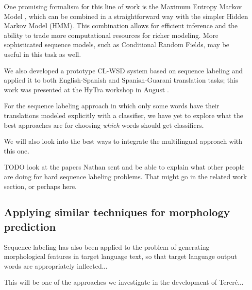 One promising formalism for this line of work is the Maximum Entropy Markov
Model \cite{icml00/mccallum}, which can be combined in a straightforward way
with the simpler Hidden Markov Model (HMM).
This combination allows for efficient inference and the ability to trade more
computational resources for richer modeling. More sophisticated sequence
models, such as Conditional Random Fields, may be useful in this task as well.

We also developed a prototype CL-WSD system based on sequence labeling and
applied it to both English-Spanish and Spanish-Guarani translation tasks; this
work was presented at the HyTra workshop in August
\cite{rudnick-gasser:2013:HyTra-2013}.

For the sequence labeling approach in which only some words have their
translations modeled explicitly with a classifier, we have yet to explore what
the best approaches are for choosing \emph{which} words should get classifiers.

We will also look into the best ways to integrate the multilingual approach
with this one.

TODO look at the papers Nathan sent and be able to explain what other people
are doing for hard sequence labeling problems. That might go in the related
work section, or perhaps here.

\subsection{Applying similar techniques for morphology prediction}

Sequence labeling has also been applied to the problem of generating
morphological features in target language text, so that target language output
words are appropriately inflected...
\cite{toutanova-suzuki-ruopp:2008:ACLMain}

This will be one of the approaches we investigate in the development of
Tereré...

